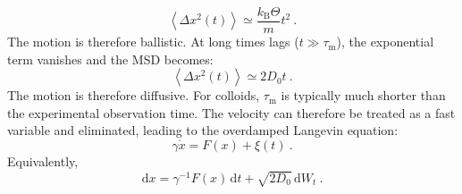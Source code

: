 \begin{equation}
    \left\langle \Delta x^2(t)\right\rangle \simeq \dfrac{k_\mathrm{B}\Theta}{m}t^2~.
    \label{msd_shorttimes}
\end{equation}
The motion is therefore ballistic. At long times lags ($t \gg\tau_\mathrm{m}$), the exponential term vanishes and the MSD becomes:
\begin{equation}
    \left\langle \Delta x^2(t)\right\rangle \simeq 2D_0t~.
    \label{msd_longtimes}
\end{equation}
The motion is therefore diffusive. For colloids, $\tau_\mathrm{m}$ is typically much shorter than the experimental observation time. The velocity can therefore be treated as a fast variable and eliminated, leading to the overdamped Langevin equation:
\begin{equation}
    \boxed{
    \gamma \dot{x} = F(x) + \xi(t)}~.
\end{equation}
Equivalently,
\begin{equation}
    \mathrm{d}x=\gamma^{-1} F(x)\,\mathrm{d}t+\sqrt{2D_0}\,\mathrm{d}W_t~.
\end{equation}




